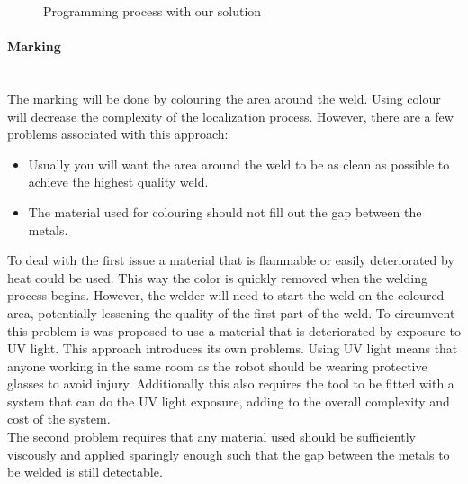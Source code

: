 \begin{figure}[h]
\centering
{}
\caption{Programming process with our solution}
\label{programming_state_diagram}
\end{figure}

\paragraph*{Marking}~\\
The marking will be done by colouring the area around the weld. 
Using colour will decrease the complexity of the localization process. 
However, there are a few problems associated with this approach: 
\begin{itemize}
	\item Usually you will want the area around the weld to be as clean as possible to achieve the highest quality weld.
	\item The material used for colouring should not fill out the gap between the metals.
\end{itemize}
To deal with the first issue a material that is flammable or easily deteriorated by heat could be used. 
This way the color is quickly removed when the welding process begins. 
However, the welder will need to start the weld on the coloured area, potentially lessening the quality of the first part of the weld. 
To circumvent this problem is was proposed to use a material that is deteriorated by exposure to UV light\cite{uvlight}.
This approach introduces its own problems. 
Using UV light means that anyone working in the same room as the robot should be wearing protective glasses to avoid injury. 
Additionally this also requires the tool to be fitted with a system that can do the UV light exposure, adding to the overall complexity and cost of the system.\\
The second problem requires that any material used should be sufficiently viscously and applied sparingly enough such that the gap between the metals to be welded is still detectable.

